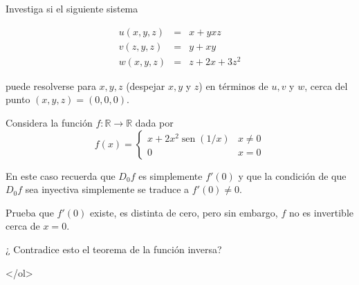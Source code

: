 \documentclass{article}
\theoremstyle{definition}
\newcommand{\sen}{\operatorname{sen}}
\begin{document}
        \item Investiga si el siguiente sistema

          \begin{eqnarray*}
            u(x,y,z)&=&x+yxz \\
            v(z,y,z)&=&y+xy\\
            w(x,y,z)&=&z+2x+3z^2
          \end{eqnarray*}

          puede resolverse para $x,y,z$ (despejar $x,y$ y $z$) en términos
          de $u,v$ y $w$, cerca del punto $(x,y,z)=(0,0,0)$.
          
        \item Considera la función $f:\mathbb{R}\to \mathbb{R}$ dada por
          $$
          f(x)=\left\{
            \begin{array}{cc}
              x+2x^2\sen(1/x) & x\ne 0 \\
              0 & x=0
              \end{array}
            \right.
          $$

          En este caso recuerda que $D_0f$ es simplemente $f'(0)$ y que
          la condición de que $D_0f$ sea inyectiva simplemente se traduce
          a $f'(0)\ne0$.

          Prueba que $f'(0)$ existe, es distinta de cero, pero sin embargo,
          $f$ no es invertible cerca de $x=0$.

          ¿ Contradice esto el teorema de la función inversa?
            
          </ol>
          

          

	
  
       
\end{document}
